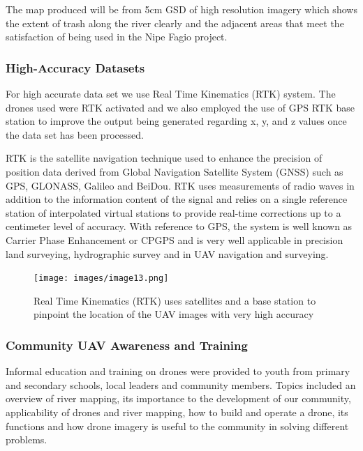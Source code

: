 \documentclass[a4paper,12pt,twoside]{article}
\begin{document}
    The map produced will be from 5cm GSD of high resolution imagery which shows the extent of trash along the river clearly and the adjacent areas that meet the satisfaction of being used in the Nipe Fagio project.
    
    \subsubsection{High-Accuracy Datasets}
    
    For high accurate data set we use Real Time Kinematics (RTK) system. The  drones used were RTK activated and we also employed the use of GPS RTK base station to improve the output being generated regarding x, y, and z values once the data set has been processed.
    
    RTK is the satellite navigation technique used to enhance the precision of position data derived from Global Navigation Satellite System (GNSS) such as GPS, GLONASS, Galileo and BeiDou. RTK uses measurements of radio waves in addition to the information content of the signal and relies on a single reference station of interpolated virtual stations to provide real-time corrections up to a centimeter level of accuracy. With reference to GPS, the system is well known as Carrier Phase Enhancement or CPGPS and is very well applicable in precision land surveying, hydrographic survey and in UAV navigation and surveying.
    
        \begin{figure} %
            \centering
            \texttt{[image: images/image13.png]}
            \caption{Real Time Kinematics (RTK) uses satellites and a base station to pinpoint the location of the UAV images with very high accuracy}
        \end{figure}
    
     \subsubsection{Community UAV Awareness and Training}
     Informal education and training on drones were provided to youth from primary and secondary schools, local leaders and community members. Topics included an overview of river mapping, its importance to the development of our community, applicability of drones and river mapping, how to build and operate a drone, its functions and how drone imagery is useful to the community in solving different problems.
     
\end{document}
